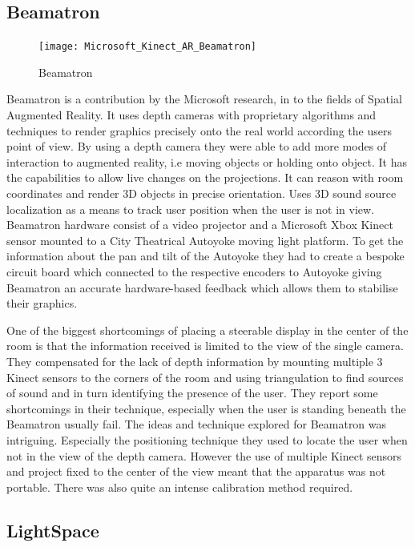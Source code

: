 \subsection{Beamatron}

\begin{figure}[h]
\texttt{[image: Microsoft\_Kinect\_AR\_Beamatron]}

\protect\caption{Beamatron}


\end{figure}


Beamatron \cite{beamatron} is a contribution by the Microsoft research,
in to the fields of Spatial Augmented Reality. It uses depth cameras
with proprietary algorithms and techniques to render graphics precisely
onto the real world according the users point of view. By using a
depth camera they were able to add more modes of interaction to augmented
reality, i.e moving objects or holding onto object. It has the capabilities
to allow live changes on the projections. It can reason with room
coordinates and render 3D objects in precise orientation. Uses 3D
sound source localization as a means to track user position when the
user is not in view. 
Beamatron hardware consist of a video projector and a Microsoft Xbox
Kinect sensor mounted to a City Theatrical Autoyoke\cite{autoyoke}
moving light platform. To get the information about the pan and tilt
of the Autoyoke they had to create a bespoke circuit board which connected
to the respective encoders to Autoyoke giving Beamatron an accurate
hardware-based feedback which allows them to stabilise their graphics. 

One of the biggest shortcomings of placing a steerable display in
the center of the room is that the information received is limited
to the view of the single camera. They compensated for the lack of
depth information by mounting multiple 3 Kinect sensors to the corners
of the room and using triangulation to find sources of sound and in
turn identifying the presence of the user. They report some shortcomings
in their technique, especially when the user is standing beneath the
Beamatron usually fail.
The ideas and technique explored for Beamatron was intriguing. Especially
the positioning technique they used to locate the user when not in
the view of the depth camera. However the use of multiple Kinect sensors
and project fixed to the center of the view meant that the apparatus
was not portable. There was also quite an intense calibration method
required.


\subsection{LightSpace}

